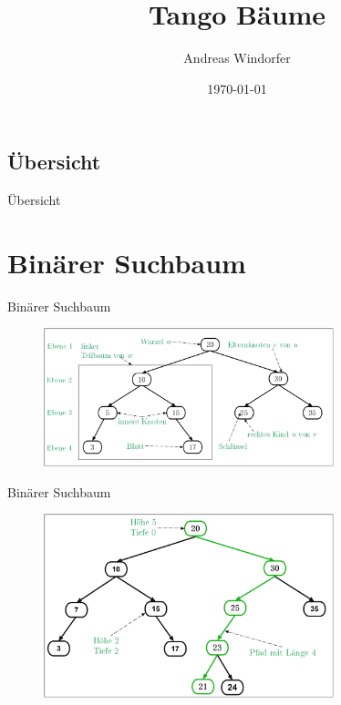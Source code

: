 \documentclass[11pt]{beamer}
\begin{document}
	\author{Andreas Windorfer}
	\title{Tango Bäume}
	\date{\today}
	\begin{frame}{}
		\titlepage
	\section{Übersicht}
	\end{frame}
		\begin{frame} {Übersicht}
		\tableofcontents[]   
		
	\end{frame}
	
	\section{Binärer Suchbaum}
	
	
		\begin{frame} {Binärer Suchbaum}
			\begin{figure}[h]
				\centering
				\includegraphics[width=0.75\textwidth]{"Medien/pres/ioSuchbaum"}
			\end{figure}    
		\end{frame}

			\begin{frame} {Binärer Suchbaum}
			\begin{figure}[h]
				\centering
				\includegraphics[width=0.75\textwidth]{"Medien/pres/suchbaum2_2"}
			\end{figure}    
		\end{frame}
\end{document}
